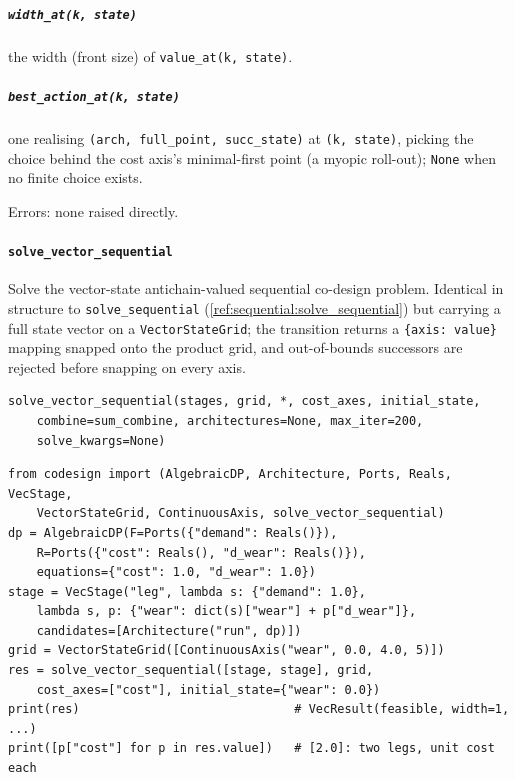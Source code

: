 \documentclass[11pt,a4paper]{article}
\begin{document}
\subparagraph{\texttt{width\_at(k, state)}} the width (front size) of
\texttt{value\_at(k, state)}.

\subparagraph{\texttt{best\_action\_at(k, state)}} one realising
\texttt{(arch, full\_point, succ\_state)} at \texttt{(k, state)}, picking the
choice behind the cost axis's minimal-first point (a myopic roll-out);
\texttt{None} when no finite choice exists.

Errors: none raised directly.

\paragraph{\texttt{solve\_vector\_sequential}}\label{ref:vector_dp:solve_vector_sequential}
Solve the vector-state antichain-valued sequential co-design problem.
Identical in structure to
\texttt{solve\_sequential} (\ref{ref:sequential:solve_sequential}) but
carrying a full state vector on a \texttt{VectorStateGrid}; the transition
returns a \texttt{\{axis: value\}} mapping snapped onto the product grid, and
out-of-bounds successors are rejected before snapping on every axis.

\begin{lstlisting}
solve_vector_sequential(stages, grid, *, cost_axes, initial_state,
    combine=sum_combine, architectures=None, max_iter=200,
    solve_kwargs=None)
\end{lstlisting}

\begin{lstlisting}
from codesign import (AlgebraicDP, Architecture, Ports, Reals, VecStage,
    VectorStateGrid, ContinuousAxis, solve_vector_sequential)
dp = AlgebraicDP(F=Ports({"demand": Reals()}),
    R=Ports({"cost": Reals(), "d_wear": Reals()}),
    equations={"cost": 1.0, "d_wear": 1.0})
stage = VecStage("leg", lambda s: {"demand": 1.0},
    lambda s, p: {"wear": dict(s)["wear"] + p["d_wear"]},
    candidates=[Architecture("run", dp)])
grid = VectorStateGrid([ContinuousAxis("wear", 0.0, 4.0, 5)])
res = solve_vector_sequential([stage, stage], grid,
    cost_axes=["cost"], initial_state={"wear": 0.0})
print(res)                              # VecResult(feasible, width=1, ...)
print([p["cost"] for p in res.value])   # [2.0]: two legs, unit cost each
\end{lstlisting}
\end{document}
